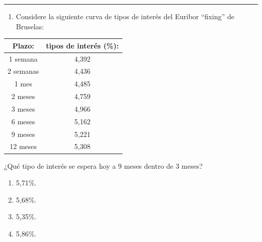 \documentclass[
  letterpaper,
  DIV=11,
  numbers=noendperiod]{scrreprt}
\providecommand{\tightlist}{%
  \setlength{\itemsep}{0pt}\setlength{\parskip}{0pt}}\usepackage{longtable,booktabs,array}
\begin{document}
\begin{center}\rule{0.5\linewidth}{0.5pt}\end{center}

\begin{enumerate}
\def\labelenumi{\arabic{enumi}.}
\setcounter{enumi}{42}
\tightlist
\item
  Considere la siguiente curva de tipos de interés del Euribor
  ``fixing'' de Bruselas:
\end{enumerate}

\begin{longtable}[]{@{}cc@{}}
\toprule()
\textbf{Plazo:} & \textbf{tipos de interés (\%):} \\
\midrule()
\endhead
1 semana & 4,392 \\
2 semanas & 4,436 \\
1 mes & 4,485 \\
2 meses & 4,759 \\
3 meses & 4,966 \\
6 meses & 5,162 \\
9 meses & 5,221 \\
12 meses & 5,308 \\
\bottomrule()
\end{longtable}

¿Qué tipo de interés se espera hoy a 9 meses dentro de 3 meses?

\begin{enumerate}
\def\labelenumi{\alph{enumi}.}
\item
  5,71\%.
\item
  5,68\%.
\item
  5,35\%.
\item
  5,86\%.
\end{enumerate}
\end{document}

